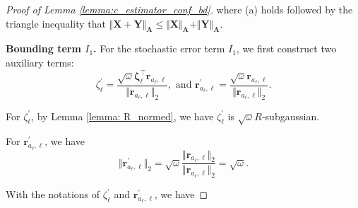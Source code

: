 \begin{proof}[Proof of Lemma \ref{lemma:c_estimator_conf_bd}]
where (a) holds followed by the triangle inequality that $\Vert \boldsymbol{X} + \boldsymbol{Y} \Vert_{\boldsymbol{A}} \leq \Vert \boldsymbol{X} \Vert_{\boldsymbol{A}} + \Vert \boldsymbol{Y} \Vert_{\boldsymbol{A}}$.

\textbf{Bounding term $I_1$.}
For the stochastic error term $I_1$, we first construct two auxiliary terms: 
\[
\zeta_{\ell}^{\prime} = \frac{\sqrt{\omega} \boldsymbol{\zeta}_{\ell}^{\top} \boldsymbol{r}_{a_{\ell}, \ell}}{\Vert \boldsymbol{r}_{a_{\ell}, \ell} \Vert_2}, 
\text{ and }
\boldsymbol{r}_{a_{\ell}, \ell}^{\prime} = \frac{\sqrt{\omega} \boldsymbol{r}_{a_{\ell}, \ell}}{\Vert \boldsymbol{r}_{a_{\ell}, \ell} \Vert_2}.
\]


For $\zeta_{\ell}^{\prime}$, by Lemma \ref{lemma: R_normed}, we have $\zeta_{\ell}^{\prime}$ is $\sqrt{\omega} R$-subgaussian.


For $\boldsymbol{r}_{a_{\ell}, \ell}^{\prime}$, we have 
\[\Vert \boldsymbol{r}_{a_{\ell}, \ell}^{\prime} \Vert _2 = \sqrt{\omega} \frac{\Vert \boldsymbol{r}_{a_{\ell}, \ell} \Vert_2}{\Vert \boldsymbol{r}_{a_{\ell}, \ell} \Vert_2}=\sqrt{\omega}.
\]

With the notations of $\zeta_{\ell}^{\prime}$ and $\boldsymbol{r}_{a_{\ell}, \ell}^{\prime}$, we have 


\end{proof}
